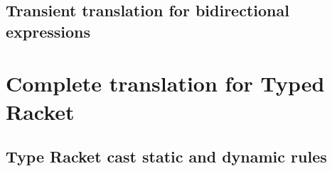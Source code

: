 \documentclass[a4paper,USenglish]{tex/lipics-v2016}
\begin{document}
\begin{mathpar}





\end{mathpar}

\subsection{Transient translation for bidirectional expressions}

\begin{mathpar}

\end{mathpar}

\section{Complete translation for Typed Racket}

\subsection{Type Racket cast static and dynamic rules}
\end{document}
